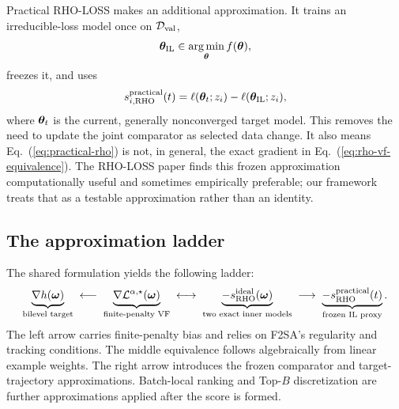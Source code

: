 Practical RHO-LOSS makes an additional approximation. It trains an
irreducible-loss model once on $\mathcal{D}_{\mathrm{val}}$,
\begin{equation}
{\bm{\theta}}_{\mathrm{IL}}\in\operatorname*{arg\,min}_{{\bm{\theta}}}f({\bm{\theta}}),
\end{equation}
freezes it, and uses
\begin{equation}
s_{i,\mathrm{RHO}}^{\mathrm{practical}}(t)
=\ell({\bm{\theta}}_t;z_i)-\ell({\bm{\theta}}_{\mathrm{IL}};z_i),
\label{eq:practical-rho}
\end{equation}
where ${\bm{\theta}}_t$ is the current, generally nonconverged target model. This
removes the need to update the joint comparator as selected data change. It
also means Eq.~(\ref{eq:practical-rho}) is not, in general, the exact gradient
in Eq.~(\ref{eq:rho-vf-equivalence}). The RHO-LOSS paper finds this frozen
approximation computationally useful and sometimes empirically preferable;
our framework treats that as a testable approximation rather than an
identity.

\subsection{The approximation ladder}

The shared formulation yields the following ladder:
\begin{equation}
\underbrace{\nabla h({\bm{\omega}})}_{\text{bilevel target}}
\;\longleftarrow\;
\underbrace{\nabla\mathcal{L}^{\alpha,\star}({\bm{\omega}})}_{\text{finite-penalty VF}}
\;\longleftrightarrow\;
\underbrace{-s_{\mathrm{RHO}}^{\mathrm{ideal}}({\bm{\omega}})}_{\text{two exact inner models}}
\;\longrightarrow\;
\underbrace{-s_{\mathrm{RHO}}^{\mathrm{practical}}(t)}_{\text{frozen IL proxy}}.
\label{eq:approximation-ladder}
\end{equation}
The left arrow carries finite-penalty bias and relies on F2SA's regularity and
tracking conditions. The middle equivalence follows algebraically from
linear example weights. The right arrow introduces the frozen comparator and
target-trajectory approximations. Batch-local ranking and Top-$B$
discretization are further approximations applied after the score is formed.
